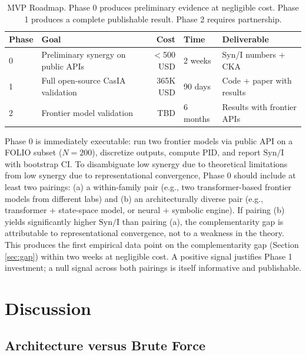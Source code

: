 \documentclass[11pt,a4paper]{article}
\theoremstyle{remark}
\newcommand{\Syn}{\mathrm{Syn}}
\newcommand{\MI}{\mathrm{I}}
\begin{document}
\begin{table}[H]
\centering
\begin{tabular}{@{}llrll@{}}
\toprule
\textbf{Phase} & \textbf{Goal} & \textbf{Cost} & \textbf{Time} & \textbf{Deliverable} \\
\midrule
0 & Preliminary synergy on public APIs & $<$500 USD & 2 weeks & Syn/I numbers + CKA \\
1 & Full open-source CasIA validation & 365K USD & 90 days & Code + paper with results \\
2 & Frontier model validation & TBD & 6 months & Results with frontier APIs \\
\bottomrule
\end{tabular}
\caption{MVP Roadmap. Phase 0 produces preliminary evidence at negligible cost. Phase 1 produces a complete publishable result. Phase 2 requires partnership.}
\label{tab:roadmap}
\end{table}

Phase 0 is immediately executable: run two frontier models via public API on a FOLIO subset ($N = 200$), discretize outputs, compute PID, and report $\Syn/\MI$ with bootstrap CI. To disambiguate low synergy due to theoretical limitations from low synergy due to representational convergence, Phase 0 should include at least two pairings: (a) a within-family pair (e.g., two transformer-based frontier models from different labs) and (b) an architecturally diverse pair (e.g., transformer + state-space model, or neural + symbolic engine). If pairing (b) yields significantly higher $\Syn/\MI$ than pairing (a), the complementarity gap is attributable to representational convergence, not to a weakness in the theory. This produces the first empirical data point on the complementarity gap (Section \ref{sec:gap}) within two weeks at negligible cost. A positive signal justifies Phase 1 investment; a null signal across both pairings is itself informative and publishable.

\section{Discussion}
\label{sec:discussion}

\subsection{Architecture versus Brute Force}
\end{document}
